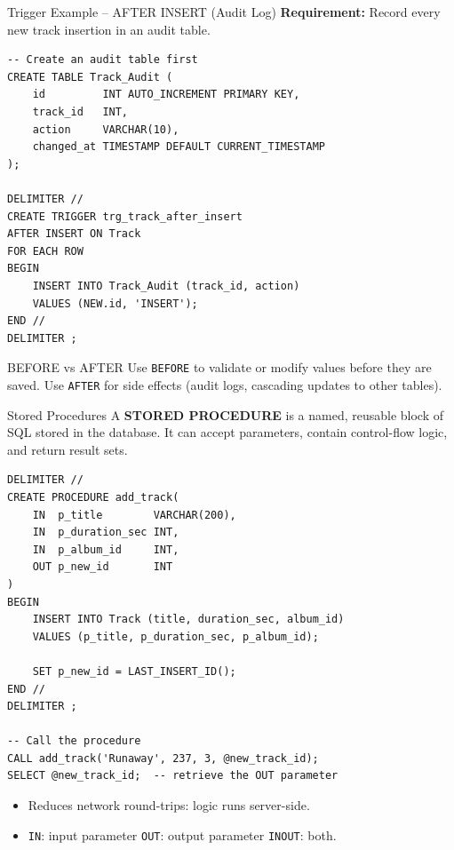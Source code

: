 \begin{frame}[fragile]{Trigger Example -- AFTER INSERT (Audit Log)}
  \textbf{Requirement:} Record every new track insertion in an audit table.

  \begin{lstlisting}[style=sqlstyle]
-- Create an audit table first
CREATE TABLE Track_Audit (
    id         INT AUTO_INCREMENT PRIMARY KEY,
    track_id   INT,
    action     VARCHAR(10),
    changed_at TIMESTAMP DEFAULT CURRENT_TIMESTAMP
);

DELIMITER //
CREATE TRIGGER trg_track_after_insert
AFTER INSERT ON Track
FOR EACH ROW
BEGIN
    INSERT INTO Track_Audit (track_id, action)
    VALUES (NEW.id, 'INSERT');
END //
DELIMITER ;
  \end{lstlisting}

  \begin{block}{BEFORE vs AFTER}
    Use \texttt{BEFORE} to validate or modify values before they are saved.
    Use \texttt{AFTER} for side effects (audit logs, cascading updates to other tables).
  \end{block}
\end{frame}

\begin{frame}[fragile]{Stored Procedures}
  A \textbf{STORED PROCEDURE} is a named, reusable block of SQL stored in the database.
  It can accept parameters, contain control-flow logic, and return result sets.

  \begin{lstlisting}[style=sqlstyle]
DELIMITER //
CREATE PROCEDURE add_track(
    IN  p_title        VARCHAR(200),
    IN  p_duration_sec INT,
    IN  p_album_id     INT,
    OUT p_new_id       INT
)
BEGIN
    INSERT INTO Track (title, duration_sec, album_id)
    VALUES (p_title, p_duration_sec, p_album_id);

    SET p_new_id = LAST_INSERT_ID();
END //
DELIMITER ;

-- Call the procedure
CALL add_track('Runaway', 237, 3, @new_track_id);
SELECT @new_track_id;  -- retrieve the OUT parameter
  \end{lstlisting}

  \begin{itemize}
    \item Reduces network round-trips: logic runs server-side.
    \item \texttt{IN}: input parameter \quad \texttt{OUT}: output parameter \quad \texttt{INOUT}: both.
  \end{itemize}
\end{frame}

